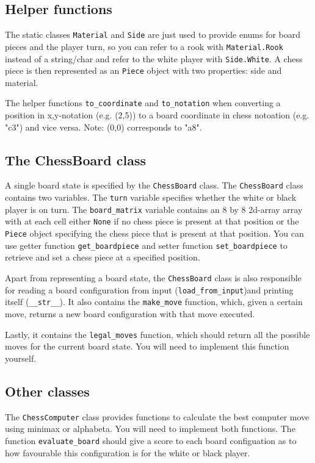 \documentclass{article}
\begin{document}
\subsection*{Helper functions}
The static classes \texttt{Material} and \texttt{Side} are just used to provide enums for board pieces and the player turn, so you can refer to a rook with \texttt{Material.Rook} instead of a string/char and refer to the white player with \texttt{Side.White}. A chess piece is then represented as an \texttt{Piece} object with two properties: side and material.

The helper functions \texttt{to\_coordinate} and \texttt{to\_notation} when converting a position in x,y-notation (e.g. (2,5)) to a board coordinate in chess notoation (e.g. "c3") and vice versa. Note: (0,0) corresponds to "a8".

\subsection*{The ChessBoard class}
A single board state is specified by the \texttt{ChessBoard} class. The \texttt{ChessBoard} class contains two variables. The \texttt{turn} variable specifies whether the white or black player is on turn. The \texttt{board\_matrix} variable contains an 8 by 8 2d-array array with at each cell either \texttt{None} if no chess piece is present at that position or the \texttt{Piece} object specifying the chess piece that is present at that position. You can use getter function \texttt{get\_boardpiece} and setter function \texttt{set\_boardpiece} to retrieve and set a chess piece at a specified position.

Apart from representing a board state, the \texttt{ChessBoard} class is also responsible for reading a board configuration from input (\texttt{load\_from\_input})and printing itself (\texttt{\_\_str\_\_}). It also contains the \texttt{make\_move} function, which, given a certain move, returns a new board configuration with that move executed. 

Lastly, it contains the \texttt{legal\_moves} function, which should return all the possible moves for the current board state. You will need to implement this function yourself.

\subsection*{Other classes}
The \texttt{ChessComputer} class provides functions to calculate the best computer move using minimax or alphabeta. You will need to implement both functions. The function \texttt{evaluate\_board} should give a score to each board configuation as to how favourable this configuration is for the white or black player.
\end{document}
